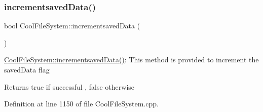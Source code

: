 \subsubsection{\texorpdfstring{incrementsaved\+Data()}{incrementsavedData()}}
{\footnotesize\ttfamily bool Cool\+File\+System\+::incrementsaved\+Data (\begin{DoxyParamCaption}{ }\end{DoxyParamCaption})}

\hyperlink{class_cool_file_system_aae045125288f255f3e258073dcada2a6}{Cool\+File\+System\+::incrementsaved\+Data()}\+: This method is provided to increment the saved\+Data flag

\begin{DoxyReturn}{Returns}
true if successful , false otherwise 
\end{DoxyReturn}


Definition at line 1150 of file Cool\+File\+System.\+cpp.


